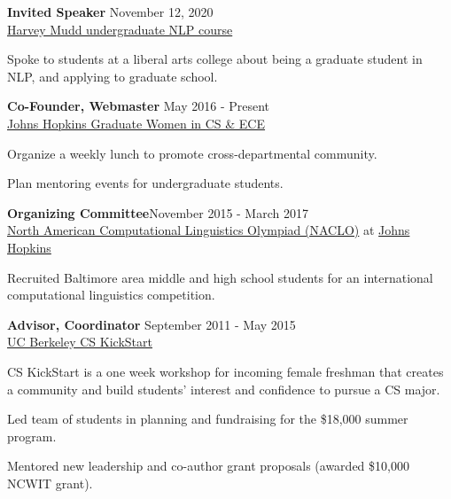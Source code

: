 \documentclass[margin,line,hyperref,color]{res}
\newenvironment{packed_itemize}{
\begin{itemize}[leftmargin=1.5em]
  \setlength{\itemsep}{0pt}
  \setlength{\parskip}{0pt}
  \setlength{\parsep}{0pt}
}{\end{itemize}}
\begin{document}
\begin{resume}
\textbf{Invited Speaker}  \hfill   November 12, 2020\\
\href{https://sites.google.com/g.hmc.edu/cs-159-fall-2020/schedule}{Harvey Mudd undergraduate NLP course}
\begin{packed_itemize}
\item  Spoke to students at a liberal arts college about being a graduate student in NLP, and applying to graduate school. 
\end{packed_itemize}


\textbf{Co-Founder, Webmaster}  \hfill   May 2016 - Present\\
\href{https://gracejhu.github.io/}{Johns Hopkins Graduate Women in CS \& ECE}
\begin{packed_itemize}
\item Organize a weekly lunch to promote cross-departmental community. 
\item Plan mentoring events for undergraduate students.
\end{packed_itemize}


\textbf{Organizing Committee}\hfill   November 2015 - March 2017 \\ 
\href{http://nacloweb.org/}{North American Computational Linguistics Olympiad (NACLO)} at \href{http://naclo.clsp.jhu.edu}{Johns Hopkins} 
\begin{packed_itemize}
\item Recruited Baltimore area middle and high school students for an international computational linguistics competition. 
\end{packed_itemize}

\textbf{Advisor, Coordinator}  \hfill   September 2011 - May 2015\\
\href{https://cs-kickstart.berkeley.edu/}{UC Berkeley CS KickStart}
\begin{packed_itemize}
\item CS KickStart is a one week workshop for incoming female freshman that creates a community and build students’ interest and confidence to pursue a CS major.
\item Led team of students in planning and fundraising for the \$18,000 summer program.
\item Mentored new leadership and co-author grant proposals (awarded \$10,000 NCWIT grant).
\end{packed_itemize}


\end{resume}
\end{document}
